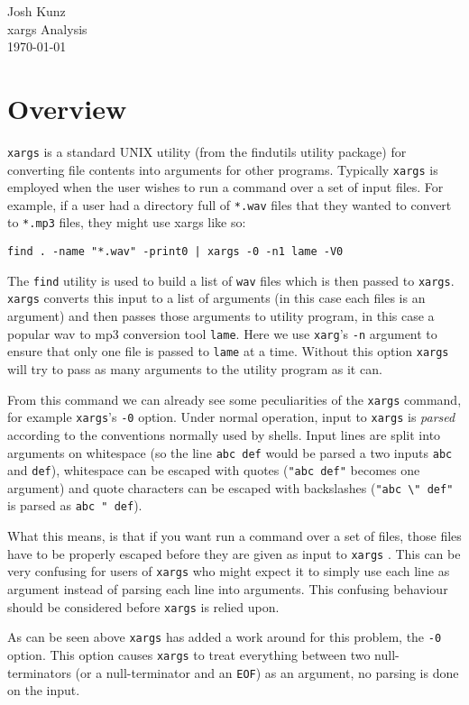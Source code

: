 \documentclass{article}
\newcommand{\header}[2]{%
    \begin{flushright}
    #1 \\
    #2 \\
    \today \\
    \end{flushright}%
}
\newcommand{\xargs}{\texttt{xargs} }
\begin{document}
\header{Josh Kunz}{xargs Analysis}

\section{Overview}
\xargs is a standard UNIX utility (from the findutils utility package) for
converting file contents into arguments for other programs. Typically \xargs is
employed when the user wishes to run a command over a set of input files. For
example, if a user had a directory full of \texttt{*.wav} files that they wanted
to convert to \texttt{*.mp3} files, they might use xargs like so:

\begin{center}
\verb$find . -name "*.wav" -print0 | xargs -0 -n1 lame -V0$
\end{center}

The \texttt{find} utility is used to build a list of \texttt{wav} files which
is then passed to \texttt{xargs}. \xargs converts this input to a list of arguments
(in this case each files is an argument) and then passes those arguments to 
utility program, in this case a popular wav to mp3 conversion tool \texttt{lame}.
Here we use \texttt{xarg}'s \verb|-n| argument to ensure that only one file is
passed to \texttt{lame} at a time. Without this option \xargs will try to pass
as many arguments to the utility program as it can.

From this command we can already see some peculiarities of the \xargs command,
for example \texttt{xargs}'s \verb|-0| option. Under normal operation, input to 
\xargs is \textit{parsed} according to the conventions normally used by shells.
Input lines are split into arguments on whitespace (so the line \texttt{abc def}
would be parsed a two inputs \texttt{abc} and \texttt{def}), whitespace can
be escaped with quotes (\texttt{"abc def"} becomes one argument) and quote
characters can be escaped with backslashes (\texttt{"abc \textbackslash" def"}
is parsed as \texttt{abc " def}).

What this means, is that if you want run a command over a set of files, those
files have to be properly escaped before they are given as input to \xargs. This
can be very confusing for users of \xargs who might expect it to simply use each
line as argument instead of parsing each line into arguments. This confusing
behaviour should be considered before \xargs is relied upon.

As can be seen above \xargs has added a work around for this problem, the 
\verb|-0| option. This option causes \xargs to treat everything between two 
null-terminators (or a null-terminator and an \texttt{EOF}) as an argument, no
parsing is done on the input.
\end{document}
